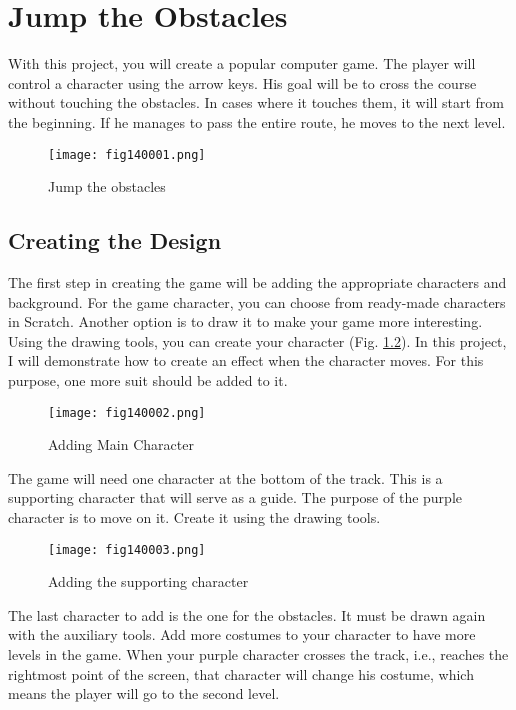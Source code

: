 \chapter{Jump the Obstacles}

With this project, you will create a popular computer game. The player will control a character using the arrow keys. His goal will be to cross the course without touching the obstacles. In cases where it touches them, it will start from the beginning. If he manages to pass the entire route, he moves to the next level.

\begin{figure}[H]
   \centering
   \texttt{[image: fig140001.png]}
   \caption{Jump the obstacles}
\label{fig140001}
\end{figure}

\section{Creating the Design}
The first step in creating the game will be adding the appropriate characters and background. For the game character, you can choose from ready-made characters in Scratch. Another option is to draw it to make your game more interesting. Using the drawing tools, you can create your character (Fig. \ref{fig140002}). In this project, I will demonstrate how to create an effect when the character moves. For this purpose, one more suit should be added to it.

\begin{figure}[H]
   \centering
   \texttt{[image: fig140002.png]}
   \caption{Adding Main Character}
\label{fig140002}
\end{figure}

The game will need one character at the bottom of the track. This is a supporting character that will serve as a guide. The purpose of the purple character is to move on it. Create it using the drawing tools.

\begin{figure}[H]
   \centering
   \texttt{[image: fig140003.png]}
   \caption{Adding the supporting character}
\label{fig140003}
\end{figure}

The last character to add is the one for the obstacles. It must be drawn again with the auxiliary tools. Add more costumes to your character to have more levels in the game. When your purple character crosses the track, i.e., reaches the rightmost point of the screen, that character will change his costume, which means the player will go to the second level.

